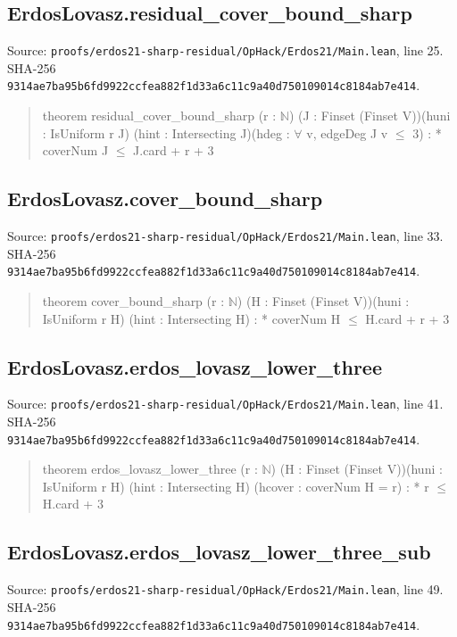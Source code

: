 \documentclass[11pt,a4paper]{article}
\begin{document}
\subsection{ErdosLovasz.residual\_cover\_bound\_sharp}
Source: \texttt{proofs/erdos21-sharp-residual/OpHack/Erdos21/Main.lean}, line 25. SHA-256 \texttt{9314ae7ba95b6fd9922ccfea882f1d33a6c11c9a40d750109014c8184ab7e414}.

\begin{quote}\small\ttfamily theorem residual\_cover\_bound\_sharp (r : \ensuremath{\mathbb{N}}) (J : Finset (Finset V))\newline (huni : IsUniform r J) (hint : Intersecting J)\newline (hdeg : \ensuremath{\forall} v, edgeDeg J v \ensuremath{\leq} 3) : * coverNum J \ensuremath{\leq} J.card + r + 3\end{quote}
\subsection{ErdosLovasz.cover\_bound\_sharp}
Source: \texttt{proofs/erdos21-sharp-residual/OpHack/Erdos21/Main.lean}, line 33. SHA-256 \texttt{9314ae7ba95b6fd9922ccfea882f1d33a6c11c9a40d750109014c8184ab7e414}.

\begin{quote}\small\ttfamily theorem cover\_bound\_sharp (r : \ensuremath{\mathbb{N}}) (H : Finset (Finset V))\newline (huni : IsUniform r H) (hint : Intersecting H) : * coverNum H \ensuremath{\leq} H.card + r + 3\end{quote}
\subsection{ErdosLovasz.erdos\_lovasz\_lower\_three}
Source: \texttt{proofs/erdos21-sharp-residual/OpHack/Erdos21/Main.lean}, line 41. SHA-256 \texttt{9314ae7ba95b6fd9922ccfea882f1d33a6c11c9a40d750109014c8184ab7e414}.

\begin{quote}\small\ttfamily theorem erdos\_lovasz\_lower\_three (r : \ensuremath{\mathbb{N}}) (H : Finset (Finset V))\newline (huni : IsUniform r H) (hint : Intersecting H) (hcover : coverNum H = r) : * r \ensuremath{\leq} H.card + 3\end{quote}
\subsection{ErdosLovasz.erdos\_lovasz\_lower\_three\_sub}
Source: \texttt{proofs/erdos21-sharp-residual/OpHack/Erdos21/Main.lean}, line 49. SHA-256 \texttt{9314ae7ba95b6fd9922ccfea882f1d33a6c11c9a40d750109014c8184ab7e414}.
\end{document}
